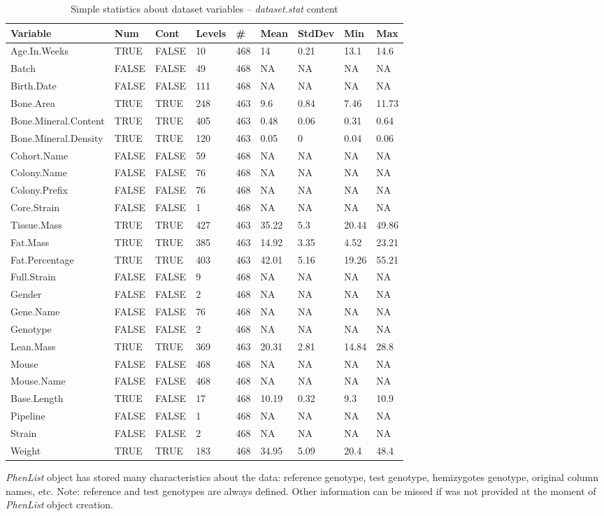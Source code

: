 \documentclass[12pt,a4paper]{article}
\begin{document}
\begin{table}[!h]
\caption{Simple statistics about dataset variables -- \textit{dataset.stat} content}\label{table:03}
\begin{center}
\begin{tabular}{|l|l| l | l | l | l | l | l | l |}
  \hline
Variable&Num&Cont&Levels&\#&Mean&StdDev&Min&Max\\\hline
Age.In.Weeks&TRUE&FALSE&10&468&14&0.21&13.1&14.6\\
Batch&FALSE&FALSE&49&468&NA&NA&NA&NA\\
Birth.Date&FALSE&FALSE&111&468&NA&NA&NA&NA\\
Bone.Area&TRUE&TRUE&248&463&9.6&0.84&7.46&11.73\\
Bone.Mineral.Content&TRUE&TRUE&405&463&0.48&0.06&0.31&0.64\\
Bone.Mineral.Density&TRUE&TRUE&120&463&0.05&0&0.04&0.06\\
Cohort.Name&FALSE&FALSE&59&468&NA&NA&NA&NA\\
Colony.Name&FALSE&FALSE&76&468&NA&NA&NA&NA\\
Colony.Prefix&FALSE&FALSE&76&468&NA&NA&NA&NA\\
Core.Strain&FALSE&FALSE&1&468&NA&NA&NA&NA\\
Tissue.Mass&TRUE&TRUE&427&463&35.22&5.3&20.44&49.86\\
Fat.Mass&TRUE&TRUE&385&463&14.92&3.35&4.52&23.21\\
Fat.Percentage&TRUE&TRUE&403&463&42.01&5.16&19.26&55.21\\
Full.Strain&FALSE&FALSE&9&468&NA&NA&NA&NA\\
Gender&FALSE&FALSE&2&468&NA&NA&NA&NA\\
Gene.Name&FALSE&FALSE&76&468&NA&NA&NA&NA\\
Genotype&FALSE&FALSE&2&468&NA&NA&NA&NA\\
Lean.Mass&TRUE&TRUE&369&463&20.31&2.81&14.84&28.8\\
Mouse&FALSE&FALSE&468&468&NA&NA&NA&NA\\
Mouse.Name&FALSE&FALSE&468&468&NA&NA&NA&NA\\
Base.Length&TRUE&FALSE&17&468&10.19&0.32&9.3&10.9\\
Pipeline&FALSE&FALSE&1&468&NA&NA&NA&NA\\
Strain&FALSE&FALSE&2&468&NA&NA&NA&NA\\
Weight&TRUE&TRUE&183&468&34.95&5.09&20.4&48.4\\
\hline  
\end{tabular}
\end{center}
\end{table}
\textit{PhenList} object has stored many characteristics about the data: reference genotype, test genotype, hemizygotes genotype, original column names, etc.
Note: reference and test genotypes are always defined. Other information can be missed if was not provided at the moment of \textit{PhenList} object creation. 
\end{document}

